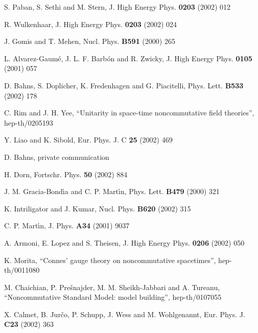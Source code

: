\documentclass[a4paper,12pt]{article}
\providecommand{\1}{\mathbf{1}}         %
\providecommand{\7}{\dagger}            %
\providecommand{\8}{\bullet}            %
\renewcommand{\.}{\cdot}            %
\renewcommand{\:}{\colon}           %
\begin{document}
\begin{thebibliography}{92}
S. Paban, S. Sethi and M. Stern,
J. High Energy Phys. {\bf 0203} (2002) 012

R. Wulkenhaar,
J. High Energy Phys. {\bf 0203} (2002) 024

J. Gomis and T. Mehen,
Nucl. Phys. {\bf B591} (2000) 265

L. Alvarez-Gaum\'e, J. L. F. Barb\'on and R. Zwicky,
J. High Energy Phys. {\bf 0105} (2001) 057

D. Bahns, S. Doplicher, K. Fredenhagen and G. Piacitelli,
Phys. Lett. {\bf B533} (2002) 178

C. Rim and J. H. Yee, 
``Unitarity in space-time noncommutative field theories'', 
hep-th/0205193

Y. Liao and K. Sibold,
Eur. Phys. J. C {\bf 25} (2002) 469

D. Bahns, private communication

H. Dorn,
Fortschr. Phys. {\bf 50} (2002) 884

J. M. Gracia-Bond\'{\i}a and C. P. Mart\'{\i}n,
Phys. Lett. {\bf B479} (2000) 321

K. Intriligator and J. Kumar,
Nucl. Phys. {\bf B620} (2002) 315

C. P. Mart\'{\i}n,
J. Phys. {\bf A34} (2001) 9037

A. Armoni, E. Lopez and S. Theisen,
J. High Energy Phys. {\bf 0206} (2002) 050

K. Morita,
``Connes' gauge theory on noncommutative spacetimes'',
hep-th/0011080

M. Chaichian, P. Pre\v{s}najder, M. M. Sheikh-Jabbari and A. Tureanu,
``Noncommutative Standard Model: model building'',
hep-th/0107055

X. Calmet, B. Jur\v{c}o, P. Schupp, J. Wess and M. Wohlgenannt,
Eur. Phys. J. {\bf C23} (2002) 363


\end{thebibliography}
\end{document}
